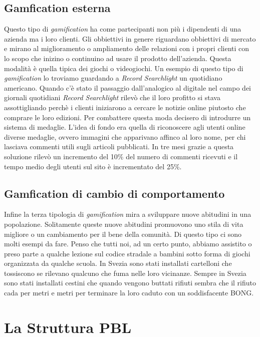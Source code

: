 \subsection{Gamfication esterna}
Questo tipo di \textit{gamification} ha come partecipanti non più i dipendenti di una azienda ma i loro clienti. Gli obbiettivi in genere riguardano obbiettivi di mercato e mirano al miglioramento o ampliamento delle relazioni con i propri clienti con lo scopo che inizino o continuino ad usare il prodotto dell'azienda. Questa modalità è quella tipica dei giochi o videogiochi. Un esempio di questo tipo di \textit{gamification} lo troviamo guardando a \textit{Record Searchlight} un quotidiano americano. Quando c'è stato il passaggio dall'analogico al digitale nel campo dei giornali quotidiani \textit{Record Searchlight} rilevò che il loro profitto si stava assottigliando perchè i clienti iniziarono a cercare le notizie online piutosto che comprare le loro edizioni. Per combattere questa moda decisero di introdurre un sistema di medaglie. L'idea di fondo era quella di riconoscere agli utenti online diverse medaglie, ovvero immagini che apparivano affinco al loro nome, per chi lasciava commenti utili sugli articoli pubblicati. In tre mesi grazie a questa soluzione rilevò un incremento del 10\% del numero di commenti ricevuti e il tempo medio degli utenti sul sito è incrementato del 25\%.
\subsection{Gamfication di cambio di comportamento}
Infine la terza tipologia di \textit{gamification} mira a sviluppare nuove abitudini in una popolazione. Solitamente queste nuove abitudini promuovono uno stila di vita migliore o un cambiamento per il bene della comunità. Di questo tipo ci sono molti esempi da fare. Penso che tutti noi, ad un certo punto, abbiamo assistito o preso parte a qualche lezione sul codice stradale a bambini sotto forma di giochi organizzata da qualche scuola. In Svezia sono stati installati cartelloni che tossiscono se rilevano qualcuno che fuma nelle loro vicinanze. Sempre in Svezia sono stati installati cestini che quando vengono buttati rifiuti sembra che il rifiuto cada per metri e metri per terminare la loro caduto con un soddisfacente BONG.
\section{La Struttura PBL}

